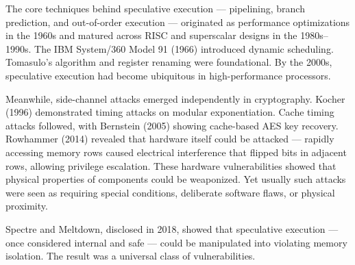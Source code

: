 \begin{historical}
The core techniques behind speculative execution — pipelining, branch prediction, and out-of-order execution — originated as performance optimizations in the 1960s and matured across RISC and superscalar designs in the 1980s–1990s. The IBM System/360 Model 91 (1966) introduced dynamic scheduling. Tomasulo's algorithm and register renaming were foundational. By the 2000s, speculative execution had become ubiquitous in high-performance processors.

Meanwhile, side-channel attacks emerged independently in cryptography. Kocher (1996) demonstrated timing attacks on modular exponentiation. Cache timing attacks followed, with Bernstein (2005) showing cache-based AES key recovery. Rowhammer (2014) revealed that hardware itself could be attacked — rapidly accessing memory rows caused electrical interference that flipped bits in adjacent rows, allowing privilege escalation. These hardware vulnerabilities showed that physical properties of components could be weaponized. Yet usually such attacks were seen as requiring special conditions, deliberate software flaws, or physical proximity.

Spectre and Meltdown, disclosed in 2018, showed that speculative execution — once considered internal and safe — could be manipulated into violating memory isolation. The result was a universal class of vulnerabilities.
\end{historical}

